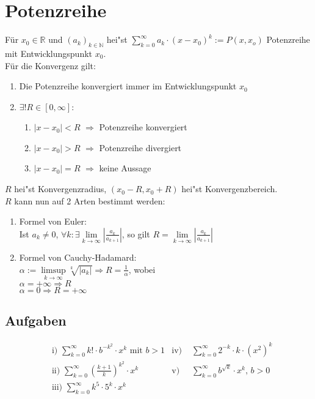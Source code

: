 \documentclass[a4paper,12pt]{article}
\begin{document}
	\section{Potenzreihe}
	\begin{defi}
		Für $x_0 \in \mathbb{R}$ und $\left(a_k\right)_{k \in \mathbb{N}}$ hei"st $\sum_{k=0}^{\infty} a_k \cdot \left(x-x_0\right)^k := P\left(x,x_o\right)$ Potenzreihe mit Entwicklungspunkt $x_0$.\\
		
		Für die Konvergenz gilt:
		\begin{enumerate}[1)]
			\item Die Potenzreihe konvergiert immer im Entwicklungspunkt $x_0$
			\item $\exists ! R \in \left[0, \infty\right]$: 
			\begin{enumerate}[]
				\item $\left|x-x_0\right| < R$ $\Rightarrow$ Potenzreihe konvergiert
				\item $\left|x-x_0\right| > R$ $\Rightarrow$ Potenzreihe divergiert
				\item $\left|x-x_0\right| = R$ $\Rightarrow$ keine Aussage
			\end{enumerate}
		\end{enumerate}
		$R$ hei"st Konvergenzradius, $\left(x_0-R, x_0+R\right)$ hei"st Konvergenzbereich.\\
		
		$R$ kann nun auf 2 Arten bestimmt werden:
		\begin{enumerate}[1)]
			\item Formel von Euler:\\Ist $a_k \neq 0$, $\forall k : \exists \lim\limits_{k \rightarrow \infty} \left|\frac{a_k}{a_{k+1}}\right|$, so gilt $R = \lim\limits_{k \rightarrow \infty} \left|\frac{a_k}{a_{k+1}}\right|$
			\item Formel von Cauchy-Hadamard:\\$\alpha := \limsup\limits_{k \rightarrow \infty} \sqrt[k]{\left|a_k\right|} \Rightarrow R = \frac{1}{\alpha}$, wobei\\
				\hspace*{1cm} $\alpha = + \infty \Rightarrow R$\\
				\hspace*{1cm} $\alpha = 0 \Rightarrow R = + \infty$
		\end{enumerate}
	\end{defi}
	
	\subsection{Aufgaben}
	\begin{align*}
		&\text{i) } \sum_{k=0}^{\infty} k! \cdot b^{-k^2} \cdot x^k \text{ mit } b > 1 &\text{iv) }& \sum_{k=0}^{\infty} 2^{-k} \cdot k \cdot \left(x^2\right)^k\\
		&\text{ii) } \sum_{k=0}^{\infty} \left(\frac{k+1}{k}\right)^{k^2} \cdot x^k &\text{v) }& \sum_{k=0}^{\infty} b^{\sqrt{k}} \cdot x^k \text{, } b > 0\\
		&\text{iii) } \sum_{k=0}^{\infty} k^5 \cdot 5^k \cdot x^k &&
	\end{align*}
\end{document}
